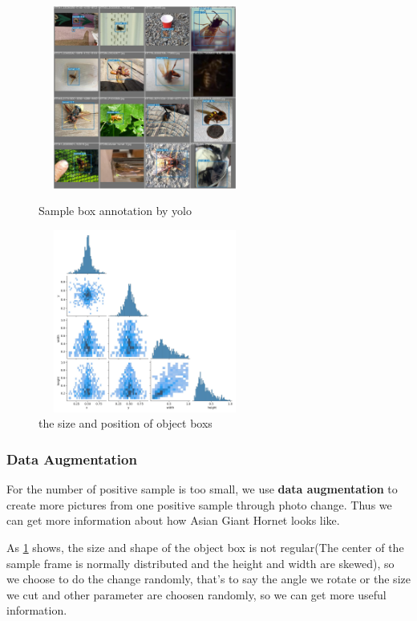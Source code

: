\documentclass[12pt]{article}
\begin{document}
\begin{figure}[H]
	\small
	\centering
	\begin{minipage}{7cm}
		\includegraphics[width=7cm,height=6cm]{./pictures/machine1.png}
		\caption{Sample box annotation by yolo}\label{nt}
	\end{minipage}
	\begin{minipage}{7cm}
		\includegraphics[width=7cm,height=6cm]{./pictures/picture_correlogram.png}
		\caption{the size and position of object boxs\protect\footnotemark[1]}
		\label{box}
	\end{minipage}
\end{figure}




\subsubsection{Data Augmentation}
For the number of positive sample is too small, we use \textbf{data augmentation} to create more pictures from one positive sample through photo change. Thus we can get more information about how Asian Giant Hornet looks like.

As \ref{box} shows, the size and shape of the object box is not regular(The center of the sample frame is normally distributed and the height and width are skewed), so we choose to do the change randomly, that's to say the angle we rotate or the size we cut and other parameter are choosen randomly, so we can get more useful information.
\end{document}
